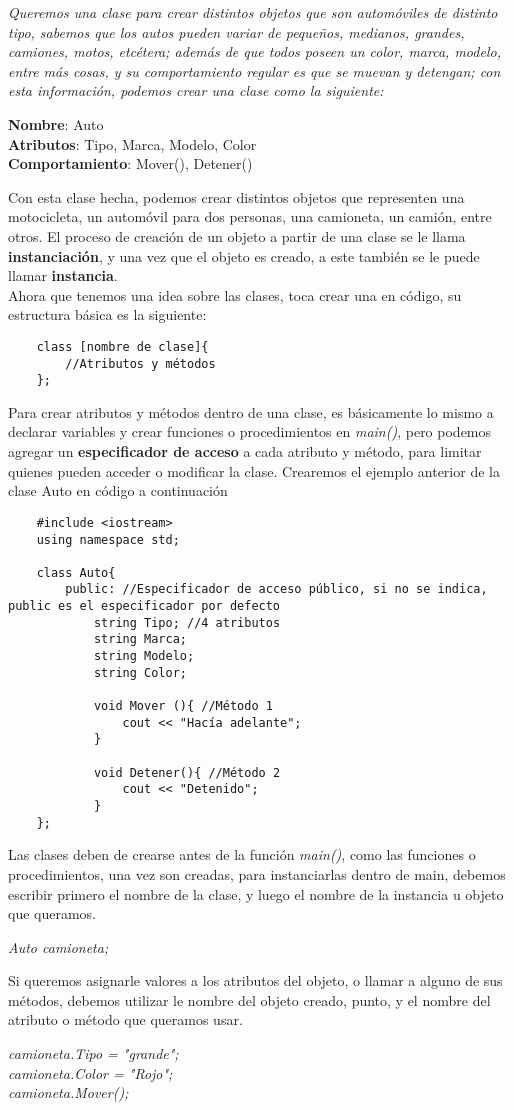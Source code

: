 \textit{Queremos una clase para crear distintos objetos que son automóviles de distinto tipo, sabemos que los autos pueden variar de pequeños, medianos, grandes, camiones, motos, etcétera; además de que todos poseen un color, marca, modelo, entre más cosas, y su comportamiento regular es que se muevan y detengan; con esta información, podemos crear una clase como la siguiente:}
\begin{center}
    \textbf{Nombre}: Auto\\
    \textbf{Atributos}: Tipo, Marca, Modelo, Color\\
    \textbf{Comportamiento}: Mover(), Detener()
\end{center}
Con esta clase hecha, podemos crear distintos objetos que representen una motocicleta, un automóvil para dos personas, una camioneta, un camión, entre otros. El proceso de creación de un objeto a partir de una clase se le llama \textbf{instanciación}, y una vez que el objeto es creado, a este también se le puede llamar \textbf{instancia}.\\
Ahora que tenemos una idea sobre las clases, toca crear una en código, su estructura básica es la siguiente:
\begin{lstlisting}
    class [nombre de clase]{
        //Atributos y métodos
    };
\end{lstlisting}
Para crear atributos y métodos dentro de una clase, es básicamente lo mismo a declarar variables y crear funciones o procedimientos en \textit{main()}, pero podemos agregar un \textbf{especificador de acceso} a cada atributo y método, para limitar quienes pueden acceder o modificar la clase. Crearemos el ejemplo anterior de la clase Auto en código a continuación
\begin{lstlisting}
    #include <iostream>
    using namespace std;

    class Auto{
        public: //Especificador de acceso público, si no se indica, public es el especificador por defecto
            string Tipo; //4 atributos
            string Marca;
            string Modelo;
            string Color;
            
            void Mover (){ //Método 1
                cout << "Hacía adelante";
            }
            
            void Detener(){ //Método 2
                cout << "Detenido";
            }
    };
\end{lstlisting}
Las clases deben de crearse antes de la función \textit{main()}, como las funciones o procedimientos, una vez son creadas, para instanciarlas dentro de main, debemos escribir primero el nombre de la clase, y luego el nombre de la instancia u objeto que queramos.\begin{center}\textit{Auto camioneta;}\end{center}
Si queremos asignarle valores a los atributos del objeto, o llamar a alguno de sus métodos, debemos utilizar le nombre del objeto creado, punto, y el nombre del atributo o método que queramos usar.\begin{center}\textit{camioneta.Tipo = "grande";\\camioneta.Color = "Rojo";\\camioneta.Mover();}\end{center}

